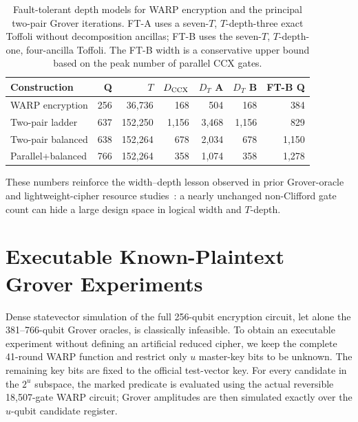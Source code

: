 \documentclass[pdflatex,sn-nature]{sn-jnl}
\theoremstyle{thmstyleone}
\theoremstyle{thmstyletwo}
\begin{document}
\begin{table}[t]
\centering
\caption{Fault-tolerant depth models for WARP encryption and the principal two-pair Grover iterations. FT-A uses a seven-$T$, $T$-depth-three exact Toffoli without decomposition ancillas; FT-B uses the seven-$T$, $T$-depth-one, four-ancilla Toffoli. The FT-B width is a conservative upper bound based on the peak number of parallel CCX gates.}
\label{tab:ft_depth_models}
\scriptsize
{\setlength{\tabcolsep}{2.2pt}
\begin{tabular}{@{}lrrrrrr@{}}
\toprule
Construction & Q & $T$ & $D_{\rm CCX}$ & $D_T$ A & $D_T$ B & FT-B Q\\
\midrule
WARP encryption & 256 & 36,736 & 168 & 504 & 168 & 384\\
Two-pair ladder & 637 & 152,250 & 1,156 & 3,468 & 1,156 & 829\\
Two-pair balanced & 638 & 152,264 & 678 & 2,034 & 678 & 1,150\\
Parallel+balanced & 766 & 152,264 & 358 & 1,074 & 358 & 1,278\\
\bottomrule
\end{tabular}}
\end{table}

These numbers reinforce the width--depth lesson observed in prior Grover-oracle and lightweight-cipher resource studies~\cite{Jaques2020,Rahman2022}: a nearly unchanged non-Clifford gate count can hide a large design space in logical width and $T$-depth.
\FloatBarrier

\section{Executable Known-Plaintext Grover Experiments}

Dense statevector simulation of the full 256-qubit encryption circuit, let alone the 381--766-qubit Grover oracles, is classically infeasible. To obtain an executable experiment without defining an artificial reduced cipher, we keep the complete 41-round WARP function and restrict only $u$ master-key bits to be unknown. The remaining key bits are fixed to the official test-vector key. For every candidate in the $2^u$ subspace, the marked predicate is evaluated using the actual reversible 18,507-gate WARP circuit; Grover amplitudes are then simulated exactly over the $u$-qubit candidate register.
\end{document}
